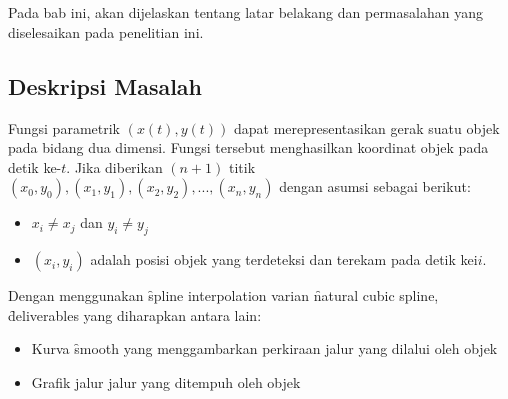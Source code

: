 \chapter{\babSatu}
\label{bab:1}
Pada bab ini, akan dijelaskan tentang latar belakang dan permasalahan yang diselesaikan pada penelitian ini.

\section{Deskripsi Masalah}
\label{sec:deskripsiMasalah}

Fungsi parametrik $(x(t),y(t))$ dapat merepresentasikan gerak suatu objek pada bidang dua dimensi. Fungsi tersebut menghasilkan koordinat objek pada detik ke-$t$.
Jika diberikan $(n+1)$ titik $(x_0,y_0),(x_1,y_1),(x_2,y_2),...,(x_n,y_n)$ dengan asumsi sebagai berikut:
\begin{itemize}
	\item $x_i \neq x_j$ dan $y_i \neq y_j$
	\item $(x_i,y_i)$ adalah posisi objek yang terdeteksi dan terekam pada detik kei$i$.
\end{itemize}
Dengan menggunakan \f{spline interpolation} varian \f{natural cubic spline}, \f{deliverables} yang diharapkan antara lain:
\begin{itemize}
	\item Kurva \f{smooth} yang menggambarkan perkiraan jalur yang dilalui oleh objek
	\item Grafik jalur jalur yang ditempuh oleh objek
\end{itemize}



